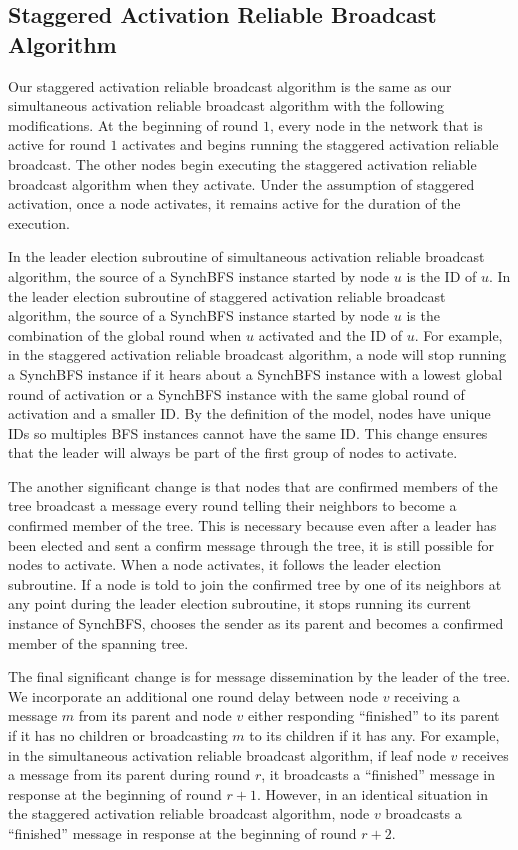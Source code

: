 \documentclass[english]{article}
\begin{document}
  \subsection {Staggered Activation Reliable Broadcast Algorithm}

Our staggered activation reliable broadcast algorithm is the same as our simultaneous activation reliable broadcast algorithm with the following modifications. At the beginning of round $1$, every node in the network that is active for round $1$ activates and begins running the staggered activation reliable broadcast. The other nodes begin executing the staggered activation reliable broadcast algorithm when they activate. Under the assumption of staggered activation, once a node activates, it remains active for the duration of the execution.

In the leader election subroutine of simultaneous activation reliable broadcast algorithm, the source of a SynchBFS instance started by node $u$ is the ID of $u$. In the leader election subroutine of staggered activation reliable broadcast algorithm, the source of a SynchBFS instance started by node $u$ is the combination of the global round when $u$ activated and the ID of $u$. For example, in the staggered activation reliable broadcast algorithm, a node will stop running a SynchBFS instance if it hears about a SynchBFS instance with a lowest global round of activation or a SynchBFS instance with the same global round of activation and a smaller ID. By the definition of the model, nodes have unique IDs so multiples BFS instances cannot have the same ID. This change ensures that the leader will always be part of the first group of nodes to activate. 

The another significant change is that nodes that are confirmed members of the tree broadcast a message every round telling their neighbors to become a confirmed member of the tree. This is necessary because even after a leader has been elected and sent a confirm message through the tree, it is still possible for nodes to activate. When a node activates, it follows the leader election subroutine. If a node is told to join the confirmed tree by one of its neighbors at any point during the leader election subroutine, it stops running its current instance of SynchBFS, chooses the sender as its parent and becomes a confirmed member of the spanning tree.

The final significant change is for message dissemination by the leader of the tree. We incorporate an additional one round delay between node $v$ receiving a message $m$ from its parent and node $v$ either responding ``finished'' to its parent if it has no children or broadcasting $m$ to its children if it has any. For example, in the simultaneous activation reliable broadcast algorithm, if leaf node $v$ receives a message from its parent during round $r$, it broadcasts a ``finished'' message in response at the beginning of round $r+1$. However, in an identical situation in the staggered activation reliable broadcast algorithm, node $v$ broadcasts a ``finished'' message in response at the beginning of round $r+2$.
\end{document}
